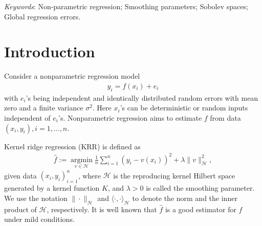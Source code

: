 \documentclass[12pt]{article}
\theoremstyle{plain}
\theoremstyle{remark}
\begin{document}
\bigskip

\begin{abstract}
An asymptotic theory is established for linear functionals of the predictive function given by kernel ridge regression, when the reproducing kernel Hilbert space is equivalent to a Sobolev space. The theory covers a wide variety of linear functionals, including point evaluations, evaluation of derivatives, $L_2$ inner products, etc. We establish the upper and lower bounds of the estimates and their asymptotic normality. %
We show the asymptotic normality of these estimators under mild conditions, which enables uncertainty quantification of a wide range of frequently used plug-in estimators. The theory also implies that the minimax $L_\infty$ error of kernel ridge regression can be attained under $\lambda\sim n^{-1}\log n$. 
\end{abstract}



\noindent%
{\it Keywords}: Non-parametric regression; Smoothing parameters; Sobolev spaces; Global regression errors. 




\section{Introduction}

Consider a nonparametric regression model 
\begin{eqnarray}\label{model}
    y_i=f(x_i)+e_i
\end{eqnarray}
with $e_i$'s being independent and identically distributed random errors with mean zero and a finite variance $\sigma^2$. Here $x_i$'s can be deterministic or random inputs independent of $e_i$'s. Nonparametric regression aims to estimate $f$ from data $(x_i,y_i),i=1,\ldots,n$.

Kernel ridge regression (KRR) is defined as
\begin{eqnarray}\label{KRR:1}
    \hat{f}:=\operatorname*{argmin}_{v\in\mathcal{H}}\frac{1}{n}\sum_{i=1}^n(y_i-v(x_i))^2+\lambda \|v\|^2_{\mathcal{H}},
\end{eqnarray}
given data $(x_i,y_i)_{i=1}^n$, where $\mathcal{H}$ is the reproducing kernel Hilbert space generated by a kernel function $K$, and $\lambda>0$ is called the smoothing parameter. We use the notation $\|\cdot\|_\mathcal{H}$ and $\langle\cdot,\cdot\rangle_\mathcal{H}$ to denote the norm and the inner product of $\mathcal{H}$, respectively. It is well known that $\hat{f}$ is a good estimator for $f$ under mild conditions.
\end{document}
